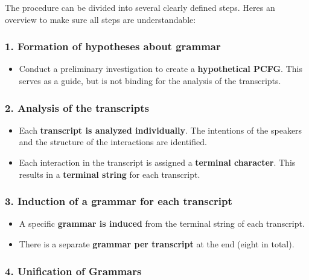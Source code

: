 \documentclass[
]{article}
\begin{document}
The procedure can be divided into several clearly defined steps.
Here\textquotesingle s an overview to make sure all steps are
understandable:

\subsubsection{\texorpdfstring{1. \textbf{Formation of hypotheses about
grammar}}{1. Formation of hypotheses about grammar}}\label{formation-of-hypotheses-about-grammar}

\begin{itemize}
\item
  Conduct a preliminary investigation to create a \textbf{hypothetical
  PCFG}. This serves as a guide, but is not binding for the analysis of
  the transcripts.
\end{itemize}

\subsubsection{\texorpdfstring{2. \textbf{Analysis of the
transcripts}}{2. Analysis of the transcripts}}\label{analysis-of-the-transcripts}

\begin{itemize}
\item
  Each \textbf{transcript is analyzed individually}. The intentions of
  the speakers and the structure of the interactions are identified.
\item
  Each interaction in the transcript is assigned a \textbf{terminal
  character}. This results in a \textbf{terminal string} for each
  transcript.
\end{itemize}

\subsubsection{\texorpdfstring{3. \textbf{Induction of a grammar for
each
transcript}}{3. Induction of a grammar for each transcript}}\label{induction-of-a-grammar-for-each-transcript}

\begin{itemize}
\item
  A specific \textbf{grammar is induced} from the terminal string of
  each transcript.
\item
  There is a separate \textbf{grammar per transcript} at the end (eight
  in total).
\end{itemize}

\subsubsection{\texorpdfstring{4. \textbf{Unification of
Grammars}}{4. Unification of Grammars}}\label{unification-of-grammars}
\end{document}
